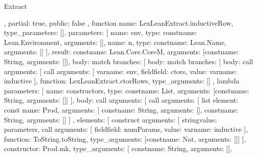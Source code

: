 \begin{lexlean}{Extract}
\begin{toolingmodule}
{{{      },
      partial: true,
      public: false
    },
    function{
      name: LexLeanExtract.inductiveRow,
      type_parameters: [],
      parameters: [
        {name: env, type: const{name: Lean.Environment, arguments: []}},
        {name: n, type: const{name: Lean.Name, arguments: []}}
      ],
      result: const{name: Lean.Core.CoreM, arguments: [const{name: String, arguments: []}]},
      body: match{
        branches: [
          {
            body: match{
              branches: [
                {
                  body: call{
                    arguments: [
                      call{
                        arguments: [
                          var{name: env},
                          field{field: ctors, value: var{name: inductive}}
                        ],
                        function: LexLeanExtract.ctorRows,
                        type_arguments: []
                      },
                      lambda{
                        parameters: [
                          {
                            name: constructors,
                            type: const{name: List, arguments: [const{name: String, arguments: []}]}
                          }
                        ],
                        body: call{
                          arguments: [
                            call{
                              arguments: [
                                list{
                                  element: const{
                                    name: Prod,
                                    arguments: [
                                      const{name: String, arguments: []},
                                      const{name: String, arguments: []}
                                    ]
                                  },
                                  elements: [
                                    construct{
                                      arguments: [
                                        string{value: parameters},
                                        call{
                                          arguments: [
                                            field{field: numParams, value: var{name: inductive}}
                                          ],
                                          function: ToString.toString,
                                          type_arguments: [const{name: Nat, arguments: []}]
                                        }
                                      ],
                                      constructor: Prod.mk,
                                      type_arguments: [
                                        const{name: String, arguments: []},
}}}}}}}}}}}}
\end{toolingmodule}
\end{lexlean}
